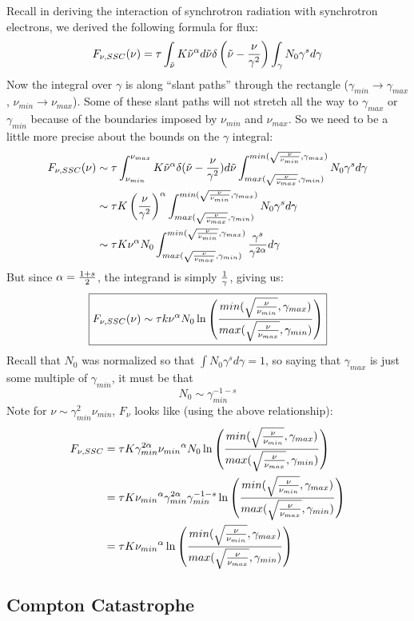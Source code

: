 \documentclass[11pt]{article}
\def\inv#1{{1 \over #1}}
\begin{document}
\def\numin{{\nu_{min}}}
\def\numax{{\nu_{max}}}
\def\gamin{\gamma_{min}}
\def\gamax{\gamma_{max}}
\def\gul{{min(\sqrt{\nu\over\numin},\gamax)}}
\def\gll{{max(\sqrt{\nu\over\numax},\gamin)}}
Recall in deriving the interaction of synchrotron radiation with
synchrotron electrons, we derived the following formula for flux:
$$F_{\nu,SSC}(\nu)=\tau\int_{{\tilde\nu}}{K{\tilde\nu}^\alpha d{\tilde\nu}\delta\left({\tilde\nu}-
{\nu\over\gamma^2}\right)\int_\gamma{N_0\gamma^sd\gamma}}$$
Now the integral over $\gamma$ is along ``slant paths'' through
the rectangle ($\gamin\to\gamax$, $\numin\to\numax$).
Some of these slant paths will not stretch all the way to $\gamax$
or $\gamin$ because of the boundaries imposed by $\numin$ and
$\numax$.  So we need to be a little more precise about the bounds
on the $\gamma$ integral:
$$\begin{aligned}F_{\nu,SSC}(\nu)
&\sim\tau\int_\numin^\numax{K\tn^\alpha\delta(\tn-{\nu\over\gamma^2})d\tn
\int_\gll^\gul{N_0\gamma^sd\gamma}}\\ 
&\sim\tau K\left({\nu\over\gamma^2}\right)^\alpha
\int_\gll^\gul{N_0\gamma^sd\gamma}\\ 
&\sim\tau K\nu^\alpha N_0
\int_\gll^\gul{{\gamma^s\over\gamma^{2\alpha}}d\gamma}\\ \end{aligned}$$
But since $\alpha={1+s\over2}$, the integrand is simply $\inv{\gamma}$,
giving us:
$$\boxed{F_{\nu,SSC}(\nu)\sim\tau k\nu^\alpha N_0\ln\left({\gul\over\gll}\right)}$$
Recall that $N_0$ was normalized so that $\int{N_0\gamma^sd\gamma}=1$, so
saying that $\gamax$ is just some multiple of $\gamin$, it must be that
$$N_0\sim\gamin^{-1-s}$$
Note for $\nu\sim\gamin^2\numin$, $F_\nu$ looks like (using the above 
relationship):
\def\gllogul{\left({\gul\over\gll}\right)}
$$\begin{aligned}F_{\nu,SSC}&=\tau K\gamin^{2\alpha}\numin^\alpha N_0\ln\gllogul\\ 
&=\tau K\numin^\alpha\gamin^{2\alpha}\gamin^{-1-s}\ln\gllogul\\ 
&=\tau K \numin^\alpha\ln\gllogul\\ \end{aligned}$$

\subsection*{ Compton Catastrophe}
\end{document}
